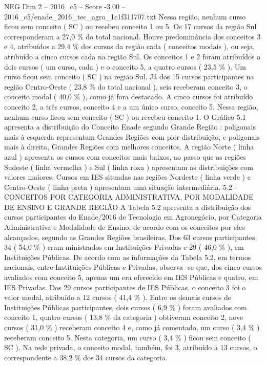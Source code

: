 \begin{textsample}{NEG Dim 2 – 2016\_c5 – Score -3.00 – 2016\_c5/enade\_2016\_tec\_agro\_1c1f311707.txt}
Nessa região, nenhum curso ficou sem conceito ( SC ) ou recebeu conceito 1 ou 5.
Os 17 cursos da região Sul corresponderam a 27,0 \% do total nacional.
Houve predominância dos conceitos 3 e 4, atribuídos a 29,4 \% dos cursos da região cada ( conceitos modais ), ou seja, atribuído a cinco cursos cada na região Sul.
Os conceitos 1 e 2 foram atribuídos a dois cursos ( um curso, cada ) e o conceito 5, a quatro cursos ( 23,5 \% ).
Um curso ficou sem conceito ( SC ) na região Sul.
Já dos 15 cursos participantes na região Centro-Oeste ( 23,8 \% do total nacional ), seis receberam conceito 3, o conceito modal ( 40,0 \% ), como já fora destacado.
A cinco cursos foi atribuído conceito 2, a três cursos, conceito 4 e a um único curso, conceito 5.
Nessa região, nenhum curso ficou sem conceito ( SC ) ou recebeu conceito 1.
O Gráfico 5.1 apresenta a distribuição do Conceito Enade segundo Grande Região : poligonais mais à esquerda representam Grandes Regiões com pior distribuição, e poligonais mais à direita, Grandes Regiões com melhores conceitos.
A região Norte ( linha azul ) apresenta os cursos com conceitos mais baixos, ao passo que as regiões Sudeste ( linha vermelha ) e Sul ( linha roxa ) apresentam as distribuições com valores maiores.
Cursos em IES situadas nas regiões Nordeste ( linha verde ) e Centro-Oeste ( linha preta ) apresentam uma situação intermediária. 5.2 - CONCEITOS POR CATEGORIA ADMINISTRATIVA, POR MODALIDADE DE ENSINO E GRANDE REGIÃO A Tabela 5.2 apresenta a distribuição dos cursos participantes do Enade/2016 de Tecnologia em Agronegócio, por Categoria Administrativa e Modalidade de Ensino, de acordo com os conceitos por eles alcançados, segundo as Grandes Regiões brasileiras.
Dos 63 cursos participantes, 34 ( 54,0 \% ) eram ministrados em Instituições Privadas e 29 ( 46,0 \% ), em Instituições Públicas.
De acordo com as informações da Tabela 5.2, em termos nacionais, entre Instituições Públicas e Privadas, observa -se que, dos cinco cursos avaliados com conceito 5, apenas um era oferecido em IES Públicas e quatro, em IES Privadas.
Dos 29 cursos participantes de IES Públicas, o conceito 3 foi o valor modal, atribuído a 12 cursos ( 41,4 \% ).
Entre os demais cursos de Instituições Públicas participantes, dois cursos ( 6,9 \% ) foram avaliados com conceito 1, quatro cursos ( 13,8 \% da categoria ) obtiveram conceito 2, nove cursos ( 31,0 \% ) receberam conceito 4 e, como já comentado, um curso ( 3,4 \% ) receberam conceito 5.
Nesta categoria, um curso ( 3,4 \% ) ficou sem conceito ( SC ).
Na rede privada, o conceito modal, também, foi 3, atribuído a 13 cursos, o correspondente a 38,2 \% dos 34 cursos da categoria.

\end{textsample}
